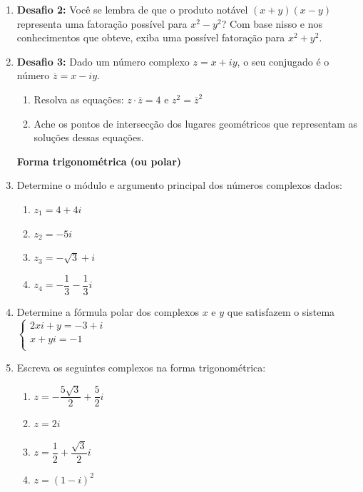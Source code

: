 \documentclass[a4paper, 11pt]{article}
\begin{document}
\begin{enumerate}
\item \textbf{Desafio 2:} Você se lembra de que o produto notável $(x + y) (x - y)$ representa uma fatoração possível para $x^2 - y^2$? Com base nisso e nos conhecimentos que obteve, exiba uma possível fatoração para $x^2 + y^2$. 

\item \textbf{Desafio 3:} Dado um número complexo $z = x + iy$, o seu conjugado é o número $\overline{z} = x - iy$.
	\begin{enumerate}
	\item Resolva as equações: $z \cdot \overline{z} = 4$ e $z^2 = \overline{z}^2$
	\item Ache os pontos de intersecção dos lugares geométricos que representam as soluções dessas equações.	
	\end{enumerate}


\begin{center}
	\textbf{Forma trigonométrica (ou polar)}
	\\
\end{center}


\item Determine o módulo e argumento principal dos números complexos dados:
	\begin{enumerate}
	\item $z_1 = 4 + 4i$
	\item $z_2 = -5i$
	\item $z_3 = -\sqrt{3} + i$
	\item $z_4 = - \dfrac{1}{3} - \dfrac{1}{3}i$
	\end{enumerate}

\item Determine a fórmula polar dos complexos $x$ e $y$ que satisfazem o sistema
\\
	
	$\left\{ \begin{array}{c}
	2xi+y = -3+i\\
	x+yi = -1\\
	\end{array}
	\right.$
	\\

\item Escreva os seguintes complexos na forma trigonométrica:
	\begin{enumerate}
	\item $z = - \dfrac{5\sqrt{3}}{2} + \dfrac{5}{2}i$
	\item $z = 2i$
	\item $z = \dfrac{1}{2} + \dfrac{\sqrt{3}}{2}i$
	\item $z = (1 - i)^2$
	\end{enumerate}


\end{enumerate}
\end{document}
